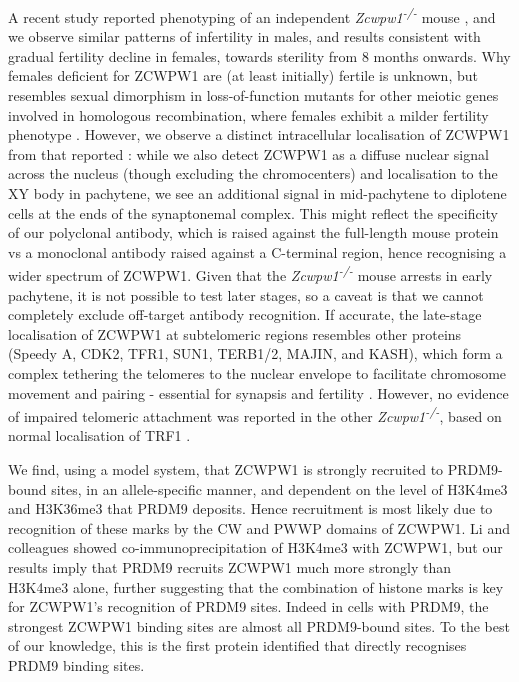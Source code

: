 A recent study reported phenotyping of an independent \textit{Zcwpw1\textsuperscript{-/-}} mouse \parencite{Li2019histone}, and we observe similar patterns of infertility in males, and results consistent with gradual fertility decline in females, towards sterility from 8 months onwards.
Why females deficient for ZCWPW1 are (at least initially) fertile is unknown, but resembles sexual dimorphism in loss-of-function mutants for other meiotic genes involved in homologous recombination, where females exhibit a milder fertility phenotype \parencite{Cahoon2019Leagues, Morelli2005Not, Zhang2019meiosisspecific}.
However, we observe a distinct intracellular localisation of ZCWPW1 from that reported \parencite{Li2019histone}: while we also detect ZCWPW1 as a diffuse nuclear signal across the nucleus (though excluding the chromocenters) and localisation to the XY body in pachytene, we see an additional signal in mid-pachytene to diplotene cells at the ends of the synaptonemal complex.
This might reflect the specificity of our polyclonal antibody, which is raised against the full-length mouse protein vs a monoclonal antibody raised against a C-terminal region, hence recognising a wider spectrum of ZCWPW1.
Given that the \textit{Zcwpw1\textsuperscript{-/-}} mouse arrests in early pachytene, it is not possible to test later stages, so a caveat is that we cannot completely exclude off-target antibody recognition.
If accurate, the late-stage localisation of ZCWPW1 at subtelomeric regions resembles other proteins (Speedy A, CDK2, TFR1, SUN1, TERB1/2, MAJIN, and KASH), which form a complex tethering the telomeres to the nuclear envelope to facilitate chromosome movement and pairing - essential for synapsis and fertility \parencite{Ashley2001Localization, Ding2007SUN1, Horn2013mammalian, Shibuya2014TRF1binding, Tu2017Speedy}.
However, no evidence of impaired telomeric attachment was reported in the other \textit{Zcwpw1\textsuperscript{-/-}}, based on normal localisation of TRF1 \parencite{Li2019histone}.

We find, using a model system, that ZCWPW1 is strongly recruited to PRDM9-bound sites, in an allele-specific manner, and dependent on the level of H3K4me3 and H3K36me3 that PRDM9 deposits.
Hence recruitment is most likely due to recognition of these marks by the CW and PWWP domains of ZCWPW1.
Li and colleagues \parencite{Li2019histone} showed co-immunoprecipitation of H3K4me3 with ZCWPW1, but our results imply that PRDM9 recruits ZCWPW1 much more strongly than H3K4me3 alone, further suggesting that the combination of histone marks is key for ZCWPW1's recognition of PRDM9 sites.
Indeed in cells with PRDM9, the strongest ZCWPW1 binding sites are almost all PRDM9-bound sites.
To the best of our knowledge, this is the first protein identified that directly recognises PRDM9 binding sites.

